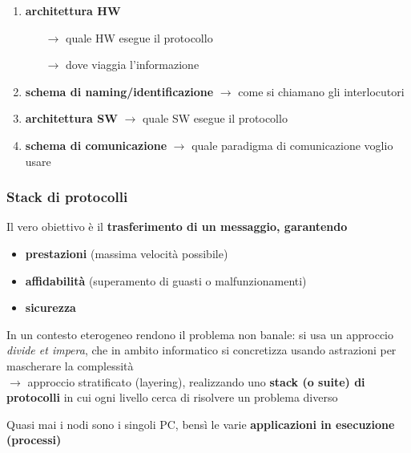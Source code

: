 \begin{example}[frametitle={4 domande fontamentali per la comunicazione tra entit\`a}]
  \begin{enumerate}
    \item \textbf{architettura HW}~\begin{minipage}[t]{.5\textwidth}
        \begin{itemize}
          \item[$\rightarrow$] quale HW esegue il protocollo
          \item[$\rightarrow$] dove viaggia l'informazione
        \end{itemize}
      \end{minipage}
    \item \textbf{schema di naming/identificazione} $\rightarrow$ come si chiamano gli interlocutori
    \item \textbf{architettura SW} $\rightarrow$ quale SW esegue il protocollo
    \item \textbf{schema di comunicazione} $\rightarrow$ quale paradigma di comunicazione voglio usare
  \end{enumerate}
\end{example}

\subsubsection{Stack di protocolli}

Il vero obiettivo \`e il \textbf{trasferimento di un messaggio, garantendo}
\begin{itemize}
  \item \textbf{prestazioni} (massima velocit\`a possibile)
  \item \textbf{affidabilit\`a} (superamento di guasti o malfunzionamenti)
  \item \textbf{sicurezza}
\end{itemize}

In un contesto eterogeneo rendono il problema non banale: si usa un approccio \textit{divide et impera}, che in ambito informatico si concretizza usando astrazioni per mascherare la complessit\`a\\
$\rightarrow$ approccio stratificato (layering), realizzando uno \textbf{stack (o suite) di protocolli} in cui ogni livello cerca di risolvere un problema diverso

\begin{emphasize}
    Quasi mai i nodi sono i singoli PC, bens\`i le varie \textbf{applicazioni in esecuzione (processi)}
\end{emphasize}

